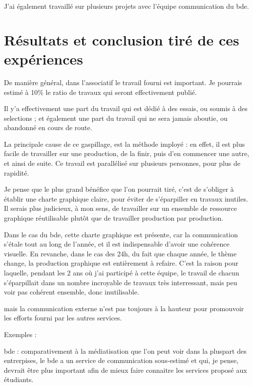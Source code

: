         J'ai également travaillé sur plusieurs projets avec l'équipe communication du bde.


\section{Résultats et conclusion tiré de ces expériences}


De manière général, dans l'associatif le travail fourni est important. Je pourrais estimé à 10\% le ratio de travaux qui seront effectivement publié.

Il y'a effectivement une part du travail qui est dédié à des essais, ou soumis à des selections ; et également une part du travail qui ne sera jamais aboutie, ou abandonné en cours de route.

La principale cause de ce gaspillage, est la méthode imployé : en effet, il est plus facile de travailler sur une production, de la finir, puis d'en commencer une autre, et ainsi de suite. Ce travail est parallélisé sur plusieurs personnes, pour plus de rapidité.

Je pense que le plus grand bénéfice que l'on pourrait tiré, c'est de s'obliger à établir une charte graphique claire, pour éviter de s'éparpiller en travaux inutiles.
Il serais plus judicieux, à mon sens, de travailler sur un ensemble de ressource graphique réutilisable plutôt que de travailler production par production.

Dans le cas du bde, cette charte graphique est présente, car la communication s'étale tout au long de l'année, et il est indispensable d'avoir une cohérence visuelle.
En revanche, dans le cas des 24h, du fait que chaque année, le thème change, la production graphique est entièrement à refaire.
C'est la raison pour laquelle, pendant les 2 ans où j'ai participé à cette équipe, le travail de chacun s'éparpillait dans un nombre incroyable de travaux très interressant, mais peu voir pas cohérent ensemble, donc inutilisable.



 mais la communication externe n'est pas toujours à la hauteur pour promouvoir les efforts fourni par les autres services.

Exemples :

    bde : comparativement à la médiatisation que l'on peut voir dans la pluspart des entrerpises, le bde a un service de communication sous-estimé et qui, je pense, devrait être plus important afin de mieux faire connaitre les services proposé aux étudiants.

